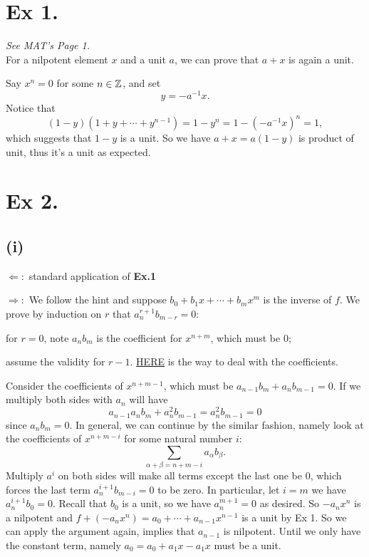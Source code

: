
\section{Ex 1.}\label{Atiyah Chapter 1 Ex 1.}
\textit{See MAT's Page 1.}\\
For a nilpotent element $x$ and a unit $a$, we can prove that $a+x$ is again a unit.

Say $x^n=0$ for some $n\in\mathbb Z$, and set $$y=-a^{-1}x.$$
Notice that 
$$(1-y)(1+y+\cdots+y^{n-1})=1-y^n=1-(-a^{-1}x)^n=1,$$ which suggests that $1-y$ is a unit.
So we have $a+x=a(1-y)$ is product of unit, thus it's a unit as expected.



\section{Ex 2.}\label{Atiyah Chapter 1 Ex 2.}
\subsection{(i)} $\Leftarrow:$ standard application of \textbf{Ex.1}

$\Rightarrow:$ We follow the hint and suppose $b_0+b_1x+\cdots+b_mx^m$ is the inverse of $f$. We prove by induction on $r$ that $a_n^{r+1}b_{m-r}=0$:

for $r=0$, note $a_nb_m$ is the coefficient for $x^{n+m}$, which must be $0$;

assume the validity for $r-1$. \href{https://math.stackexchange.com/questions/19132/characterizing-units-in-polynomial-rings}{HERE} is the way to deal with the coefficients.

Consider the coefficients of $x^{n+m-1}$, which must be 
$a_{n-1}b_m+a_nb_{m-1}=0$. If we multiply both sides with $a_n$ will have 
$$a_{n-1}a_nb_m+a_n^2b_{m-1}=a_n^2b_{m-1}=0$$ since $a_nb_m=0$.
In general, we can continue by the similar fashion, namely look at the coefficients of $x^{n+m-i}$ for some natural number $i$: 
$$\sum_{\alpha+\beta=n+m-i}a_{\alpha}b_{\beta}.$$ Multiply $a^{i}$ on both sides will make all terms except the last one be $0$, which forces the last term $a^{i+1}_{n}b_{m-i}=0$ to be zero. In particular, let $i=m$ we have $a^{i+1}_{n}b_0=0$. Recall that $b_0$ is a unit, so we have $a^{m+1}_{n}=0$ as desired. So $-a_nx^n$ is a nilpotent and $f+(-a_nx^n)=a_0+\cdots+a_{n-1}x^{n-1}$ is a unit by Ex 1. So we can apply the argument again, implies that $a_{n-1}$ is nilpotent. Until we only have the constant term, namely $a_0=a_0+a_1x-a_1x$ must be a unit.
    
